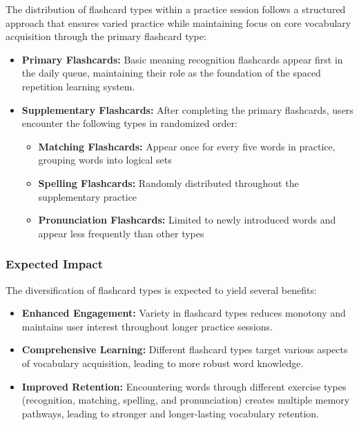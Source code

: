 The distribution of flashcard types within a practice session follows a structured approach that ensures varied practice while maintaining focus on core vocabulary acquisition through the primary flashcard type:

\begin{itemize}
    \item \textbf{Primary Flashcards:} Basic meaning recognition flashcards appear first in the daily queue, maintaining their role as the foundation of the spaced repetition learning system.
    
    \item \textbf{Supplementary Flashcards:} After completing the primary flashcards, users encounter the following types in randomized order:
    \begin{itemize}
        \item \textbf{Matching Flashcards:} Appear once for every five words in practice, grouping words into logical sets
        \item \textbf{Spelling Flashcards:} Randomly distributed throughout the supplementary practice
        \item \textbf{Pronunciation Flashcards:} Limited to newly introduced words and appear less frequently than other types
    \end{itemize}
\end{itemize}

\subsubsection{Expected Impact}

The diversification of flashcard types is expected to yield several benefits:

\begin{itemize}
    \item \textbf{Enhanced Engagement:} Variety in flashcard types reduces monotony and maintains user interest throughout longer practice sessions.
    
    \item \textbf{Comprehensive Learning:} Different flashcard types target various aspects of vocabulary acquisition, leading to more robust word knowledge.
    
    \item \textbf{Improved Retention:} Encountering words through different exercise types (recognition, matching, spelling, and pronunciation) creates multiple memory pathways, leading to stronger and longer-lasting vocabulary retention.
    
\end{itemize}

